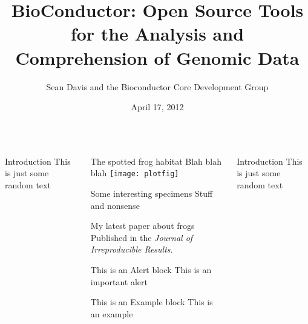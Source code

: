 \documentclass[final]{beamer}
\title{BioConductor:  Open Source Tools for the Analysis and Comprehension of Genomic Data}
\author{Sean Davis and the Bioconductor Core Development Group}
\date{April 17, 2012}
\begin{document}
\begin{frame}[t]
  \begin{columns}[t]
    \begin{column}{0.24\linewidth}
      \begin{block}{Introduction}
        This is just some random text
      \end{block}
    \end{column}
    \begin{column}{0.48\linewidth}
      \begin{block}{The spotted frog habitat}
        Blah blah blah
        \texttt{[image: plotfig]}
      \end{block}
      
      \begin{block}{Some interesting specimens}
        Stuff and nonsense
      \end{block}
      
      \begin{block}{My latest paper about frogs}
        Published in the \emph{Journal of Irreproducible Results}.
      \end{block}

   \begin{alertblock}{This is an Alert block}
   This is an important alert
   \end{alertblock}
 
   \begin{exampleblock}{This is an Example block}
   This is an example 
   \end{exampleblock}

 \end{column}
    \begin{column}{0.24\linewidth}
      \begin{block}{Introduction}
        This is just some random text
      \end{block}
    \end{column}
    \end{columns}
  \end{frame}
\end{document}
